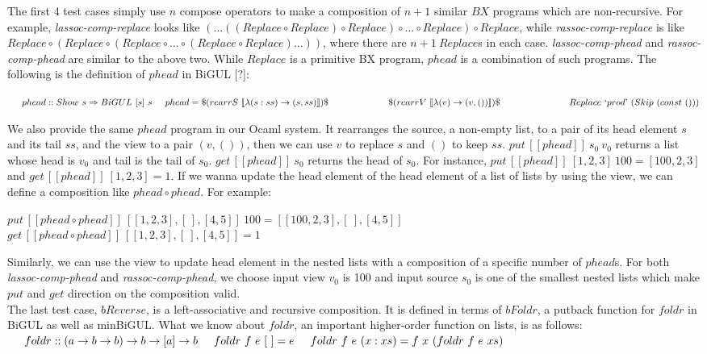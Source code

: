 \documentclass[runningheads]{llncs}
\newcommand{\tab}{\hspace*{5mm}}
\newcommand{\qtab}{\hspace*{5mm} \ \quad}
\newcommand{\putbx}[3]{put \, [\![#1]\!] \ #2 \ #3}
\newcommand{\getbx}[2]{get \, [\![#1]\!] \ #2}
\begin{document}
The first 4 test cases simply use $n$ compose operators to make a composition of $n + 1$ similar $BX$ programs which are non-recursive. For example, \textit{lassoc-comp-replace} looks like $(\ldots((Replace \circ Replace) \circ Replace) \circ \ldots \circ Replace) \circ Replace$, while \textit{rassoc-comp-replace} is like $Replace \circ (Replace \circ (Replace \circ \ldots \circ (Replace \circ Replace)\ldots))$, where there are $n + 1 \ Replace$s in each case. \textit{lassoc-comp-phead} and \textit{rassoc-comp-phead} are similar to the above two. While $Replace$ is a primitive BX program, $phead$ is a combination of such programs. The following is the definition of $phead$ in BiGUL [?]:

    $\tab phead :: Show \ s \Rightarrow BiGUL \ [s] \ s\\
    \tab phead = \$(rearrS \ [\![\lambda(s:ss) \to (s,ss)]\!])\$\\
        \qtab \qtab \quad \$(rearrV \ [\![\lambda(v) \to (v,())]\!])\$\\
            \qtab \qtab \qquad Replace \ `prod\text{'} \ (Skip \ (const \ ()))$

We also provide the same $phead$ program in our Ocaml system. It rearranges the source, a non-empty list, to a pair of its head element $s$ and its tail $ss$, and the view to a pair $(v, ())$, then we can use $v$ to replace $s$ and $()$ to keep $ss$. $\putbx{phead}{s_0}{v_0}$ returns a list whose head is $v_0$ and tail is the tail of $s_0$. $\getbx{phead}{s_0}$ returns the head of $s_0$. For instance, $\putbx{phead}{[1,2,3]}{100} = [100,2,3]$ and $\getbx{phead}{[1,2,3]} = 1$. If we wanna update the head element of the head element of a list of lists by using the view, we can define a composition like $phead \circ phead$. For example:

    \tab $\putbx{phead \circ phead}{[[1,2,3],[\ ],[4,5]]}{100} = [[100,2,3],[\ ],[4,5]]$\\
    \tab $\getbx{phead \circ phead}{[[1,2,3],[\ ],[4,5]]} = 1$

Similarly, we can use the view to update head element in the nested lists with a composition of a specific number of $phead$s. For both \textit{lassoc-comp-phead} and \textit{rassoc-comp-phead}, we choose input view $v_0$ is 100 and input source $s_0$ is one of the smallest nested lists which make $put$ and $get$ direction on the composition valid.\\

The last test case, $bReverse$, is a left-associative and recursive composition. It is defined in terms of $bFoldr$, a putback function for $foldr$ in BiGUL as well as minBiGUL. What we know about $foldr$, an important higher-order function on lists, is as follows:\\
    $\tab foldr :: (a \to b \to b) \to b \to [a] \to b\\
    \tab foldr \ f \ e \ [\ ] = e\\
    \tab foldr \ f \ e \ (x:xs) = f \ x \ (foldr \ f \ e \ xs)$
\end{document}
